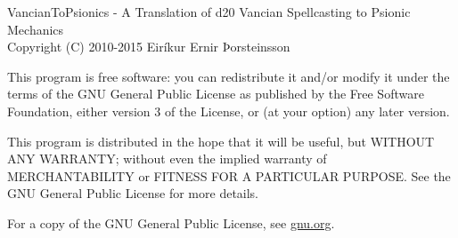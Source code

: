 VancianToPsionics - A Translation of d20 Vancian Spellcasting to Psionic Mechanics\\
Copyright (C) 2010-2015 Eiríkur Ernir Þorsteinsson

This program is free software: you can redistribute it and/or modify
it under the terms of the GNU General Public License as published by
the Free Software Foundation, either version 3 of the License, or
(at your option) any later version.

This program is distributed in the hope that it will be useful,
but WITHOUT ANY WARRANTY; without even the implied warranty of
MERCHANTABILITY or FITNESS FOR A PARTICULAR PURPOSE.  See the
GNU General Public License for more details.

For a copy of the GNU General Public License, see \href{http://www.gnu.org/licenses/}{gnu.org}.